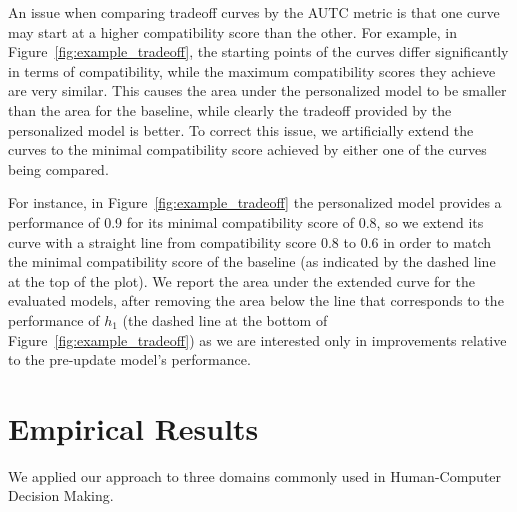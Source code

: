 \documentclass[letterpaper]{article}
\theoremstyle{definition}
\newcommand{\kibitz}[2]{\ifnum\Comments=1{\color{#1}{#2}}\fi}
\newcommand{\li}[1]{\kibitz{brown}{[LL:#1]}}
\begin{document}
An issue when comparing tradeoff curves by the AUTC metric is that one curve may start at a higher compatibility score than the other.
For example, in Figure~\ref{fig:example_tradeoff}, the starting points of the curves differ significantly in terms of compatibility, while the maximum compatibility scores they achieve are very similar.
This causes the area under the personalized model to be smaller than the area for the baseline, while clearly the tradeoff provided by the personalized model is better.
To correct this issue, we artificially extend the curves to the minimal compatibility score achieved by either one of the curves being compared.

For instance, in  Figure~\ref{fig:example_tradeoff} the personalized model provides a performance of 0.9 for its minimal compatibility score of 0.8, so we extend its curve with a straight line from compatibility score 0.8 to 0.6 in order to match the minimal compatibility score of the baseline (as indicated by the dashed line at the top of the plot). We report the area under the extended curve for the evaluated models, after removing the area below the line that corresponds to the performance of $h_1$ (the dashed line at the bottom of Figure~\ref{fig:example_tradeoff}) as we are interested only in improvements relative to the pre-update model's performance.












\section{Empirical Results}
\label{sec:results}

We applied our approach to three domains  commonly  used  in
Human-Computer Decision Making. \li{Why capitalize Human-Computer Decision-Making?}
\end{document}
